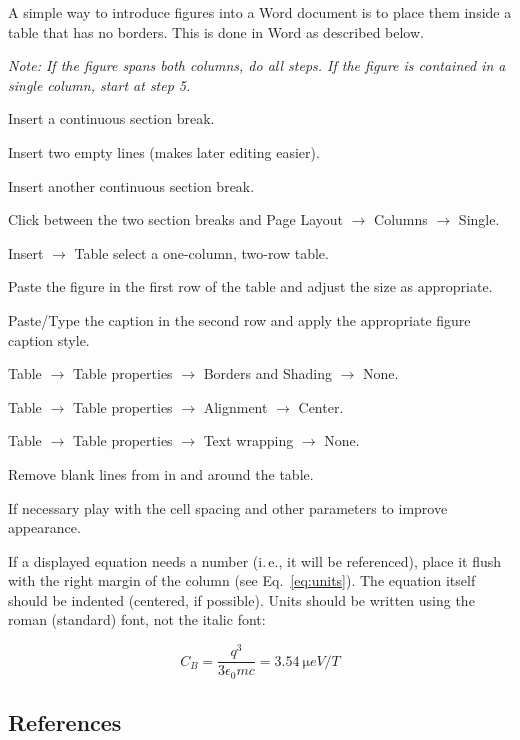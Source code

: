 \documentclass[a4paper,
              ]{jacow}
\begin{document}
A simple way to introduce figures into a Word document is to place them inside a table that has no borders. This is done in Word as described below.

\textit{Note: If the figure spans both columns, do all steps. If
the figure is contained in a single column, start at step 5.}

\begin{Enumerate}
\item	Insert a continuous section break.
\item	Insert two empty lines (makes later editing easier).
\item	Insert another continuous section break.
\item	Click between the two section breaks and Page Layout $\rightarrow$
        Columns $\rightarrow$ Single.
\item	Insert $\rightarrow$ Table select a one-column, two-row table.
\item	Paste the figure in the first row of the table and adjust the size as appropriate.
\item	Paste/Type the caption in the second row and apply the appropriate figure caption style.
\item	Table $\rightarrow$ Table properties $\rightarrow$ Borders and
        Shading $\rightarrow$ None.
\item	Table $\rightarrow$ Table properties $\rightarrow$ Alignment $\rightarrow$ Center.
\item	Table $\rightarrow$ Table properties $\rightarrow$ Text wrapping $\rightarrow$ None.
\item	Remove blank lines from in and around the table.
\item	If necessary play with the cell spacing and other parameters to improve appearance.
\end{Enumerate}

If a displayed equation needs a number (i.\,e., it will be referenced), place it flush with the right margin of the column (see Eq.~\ref{eq:units}). The equation itself should be indented (centered, if possible). Units should be written using the roman (standard) font,
not the italic font:

\begin{equation}\label{eq:units}
    C_B=\frac{q^3}{3\epsilon_{0} mc}=\SI{3.54}{\micro eV/T}
\end{equation}

\subsection{References}
\end{document}
